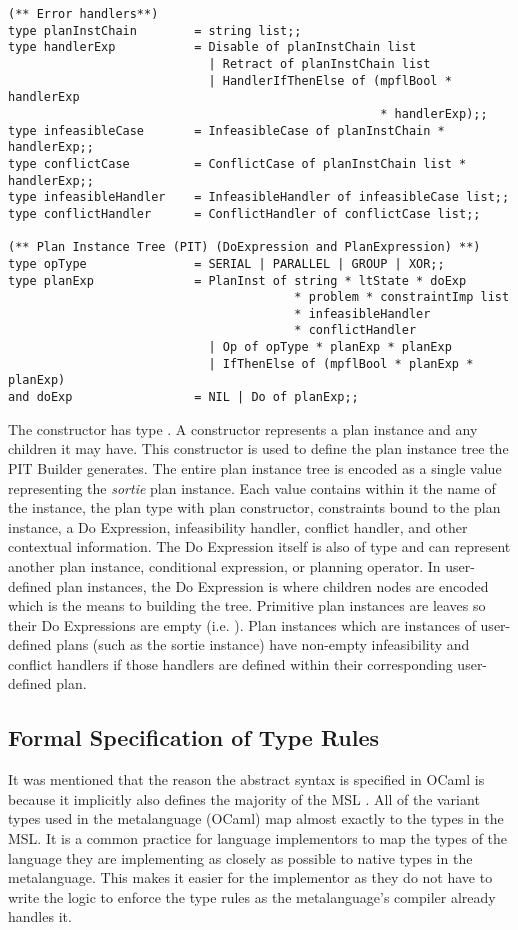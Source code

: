 \begin{verbatim}
(** Error handlers**)
type planInstChain        = string list;;
type handlerExp           = Disable of planInstChain list 
                            | Retract of planInstChain list 
                            | HandlerIfThenElse of (mpflBool * handlerExp
                                                    * handlerExp);;
type infeasibleCase       = InfeasibleCase of planInstChain * handlerExp;;
type conflictCase         = ConflictCase of planInstChain list * handlerExp;;
type infeasibleHandler    = InfeasibleHandler of infeasibleCase list;;  
type conflictHandler      = ConflictHandler of conflictCase list;;

(** Plan Instance Tree (PIT) (DoExpression and PlanExpression) **)
type opType               = SERIAL | PARALLEL | GROUP | XOR;;
type planExp              = PlanInst of string * ltState * doExp
                                        * problem * constraintImp list
                                        * infeasibleHandler 
                                        * conflictHandler 
                            | Op of opType * planExp * planExp 
                            | IfThenElse of (mpflBool * planExp * planExp)
and doExp                 = NIL | Do of planExp;;
\end{verbatim}

The  constructor has type . A  constructor represents a plan instance and any children it may have. This constructor is used to define the plan instance tree the PIT Builder generates. The entire plan instance tree is encoded as a single  value representing the \emph{sortie} plan instance. Each  value contains within it the name of the instance, the plan type with plan constructor, constraints bound to the plan instance, a Do Expression, infeasibility handler, conflict handler, and other contextual information. The Do Expression itself is also of type  and can represent another plan instance, conditional expression, or planning operator. In user-defined plan instances, the Do Expression is where children nodes are encoded which is the means to building the tree. Primitive plan instances are leaves so their Do Expressions are empty (i.e. ). Plan instances which are instances of user-defined plans (such as the sortie instance) have non-empty infeasibility and conflict handlers if those handlers are defined within their corresponding user-defined plan.

\subsection{Formal Specification of Type Rules}
It was mentioned that the reason the abstract syntax is specified in OCaml is because it implicitly also defines the majority of the MSL . All of the variant types used in the metalanguage (OCaml) map almost exactly to the types in the MSL. It is a common practice for language implementors to map the types of the language they are implementing as closely as possible to native types in the metalanguage. This makes it easier for the implementor as they do not have to write the logic to enforce the type rules as the metalanguage's compiler already handles it. 

